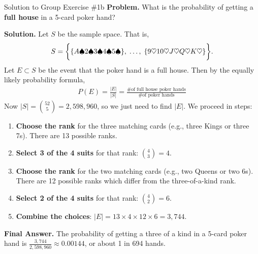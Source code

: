 \documentclass[10pt]{beamer}
\begin{document}
\begin{frame}{Solution to Group Exercise \#1b}
\footnotesize 
 \colorbox{blue!30}{\textbf{Problem.}} What is the probability of getting a \textbf{full house} in a 5-card poker hand? 
\vfill 

 \colorbox{green!30}{\textbf{Solution.}} Let $S$ be the sample space.  That is, 
\[S=\bigg\{ \{ {A\spadesuit 2 \spadesuit 3 \spadesuit 4 \spadesuit 5 \spadesuit} \}, \;   \hdots, \; \{ {9 \heartsuit 10 \heartsuit J \heartsuit Q \heartsuit K \heartsuit} \} \bigg\}. \]
Let $E \subset S$ be the event that the poker hand is a full house. Then by the equally likely probability formula, 
\begin{align*}
P(E) = 	\frac{|E|}{|S|} = \frac{\text{\# of full house poker hands}}{\text{\# of poker hands}}
\end{align*}
Now $|S|=\binom{52}{5} =  2,598,960$, so we just need to find $|E|$.   We proceed in steps:

\begin{enumerate} \footnotesize 
\item \textbf{Choose the rank} for the three matching cards 	(e.g., three Kings or three 7s).  There are 13 possible ranks.
\item \textbf{Select 3 of the 4 suits} for that rank:  $\binom{4}{3}=4$.
\item \textbf{Choose the rank} for the two matching cards 	(e.g., two Queens or two 6s).  There are 12 possible ranks which differ from the three-of-a-kind rank.
\item \textbf{Select 2 of the 4 suits} for that rank:  $\binom{4}{2}=6$.
\item \textbf{Combine the choices}:  $|E|=13 \times 4 \times 12 \times 6 = 3,744$.
\end{enumerate}

\alert{\textbf{Final Answer.}} The probability of getting a three of a kind in a 5-card poker hand is $\frac{3,744}{2,598,960} \approx 0.00144$, or about 1 in 694 hands.
\end{frame}
\end{document}
